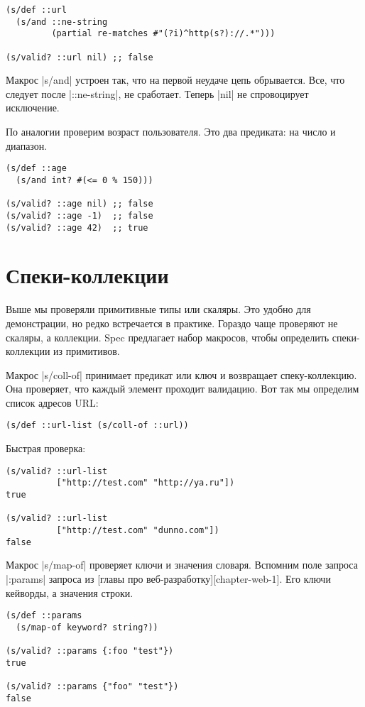 \begin{verbatim}
(s/def ::url
  (s/and ::ne-string
         (partial re-matches #"(?i)^http(s?)://.*")))

(s/valid? ::url nil) ;; false
\end{verbatim}

Макрос \spverb|s/and| устроен так, что на первой неудаче цепь обрывается. Все,
что следует после \spverb|::ne-string|, не сработает. Теперь \spverb|nil| не
спровоцирует исключение.

По аналогии проверим возраст пользователя. Это два предиката: на число и
диапазон.

\begin{verbatim}
(s/def ::age
  (s/and int? #(<= 0 % 150)))

(s/valid? ::age nil) ;; false
(s/valid? ::age -1)  ;; false
(s/valid? ::age 42)  ;; true
\end{verbatim}


\section{Спеки-коллекции}

Выше мы проверяли примитивные типы или скаляры. Это удобно для демонстрации, но
редко встречается в практике. Гораздо чаще проверяют не скаляры, а
коллекции. Spec предлагает набор макросов, чтобы определить спеки-коллекции из
примитивов.

Макрос \spverb|s/coll-of| принимает предикат или ключ и возвращает спеку-коллекцию. Она
проверяет, что каждый элемент проходит валидацию. Вот так мы определим список
адресов URL:

\begin{verbatim}
(s/def ::url-list (s/coll-of ::url))
\end{verbatim}

Быстрая проверка:

\begin{verbatim}
(s/valid? ::url-list
          ["http://test.com" "http://ya.ru"])
true

(s/valid? ::url-list
          ["http://test.com" "dunno.com"])
false
\end{verbatim}

Макрос \spverb|s/map-of| проверяет ключи и значения словаря. Вспомним поле запроса
\spverb|:params| запроса из [главы про веб-разработку][chapter-web-1]. Его ключи
кейворды, а значения строки.

\begin{verbatim}
(s/def ::params
  (s/map-of keyword? string?))

(s/valid? ::params {:foo "test"})
true

(s/valid? ::params {"foo" "test"})
false
\end{verbatim}

